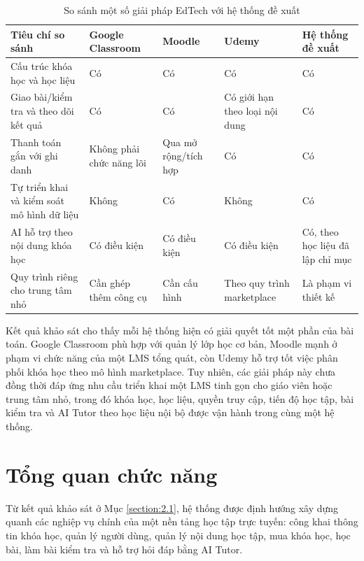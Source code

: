 ﻿\documentclass[../DoAn.tex]{subfiles}
\begin{document}
\begin{table}[H]
\centering
\caption{So sánh một số giải pháp EdTech với hệ thống đề xuất}
\label{table:2.1}
\small
\renewcommand{\arraystretch}{1.35}
\setlength{\tabcolsep}{4pt}
\begin{tabular}{|
>{\raggedright\arraybackslash}p{3.7cm}|
>{\centering\arraybackslash}p{2.35cm}|
>{\centering\arraybackslash}p{2.05cm}|
>{\centering\arraybackslash}p{2.05cm}|
>{\centering\arraybackslash}p{2.45cm}|}
\hline
\textbf{Tiêu chí so sánh} & \textbf{Google Classroom} & \textbf{Moodle} & \textbf{Udemy} & \textbf{Hệ thống đề xuất} \\ \hline
Cấu trúc khóa học và học liệu & Có & Có & Có & Có \\ \hline
Giao bài/kiểm tra và theo dõi kết quả & Có & Có & Có giới hạn theo loại nội dung & Có \\ \hline
Thanh toán gắn với ghi danh & Không phải chức năng lõi & Qua mở rộng/tích hợp & Có & Có \\ \hline
Tự triển khai và kiểm soát mô hình dữ liệu & Không & Có & Không & Có \\ \hline
AI hỗ trợ theo nội dung khóa học & Có điều kiện & Có điều kiện & Có điều kiện & Có, theo học liệu đã lập chỉ mục \\ \hline
Quy trình riêng cho trung tâm nhỏ & Cần ghép thêm công cụ & Cần cấu hình & Theo quy trình marketplace & Là phạm vi thiết kế \\ \hline
\end{tabular}
\end{table}

Kết quả khảo sát cho thấy mỗi hệ thống hiện có giải quyết tốt một phần của bài toán. Google Classroom phù hợp với quản lý lớp học cơ bản, Moodle mạnh ở phạm vi chức năng của một LMS tổng quát, còn Udemy hỗ trợ tốt việc phân phối khóa học theo mô hình marketplace. Tuy nhiên, các giải pháp này chưa đồng thời đáp ứng nhu cầu triển khai một LMS tinh gọn cho giáo viên hoặc trung tâm nhỏ, trong đó khóa học, học liệu, quyền truy cập, tiến độ học tập, bài kiểm tra và AI Tutor theo học liệu nội bộ được vận hành trong cùng một hệ thống.

\section{Tổng quan chức năng}
\label{section:2.2}

Từ kết quả khảo sát ở Mục \ref{section:2.1}, hệ thống được định hướng xây dựng quanh các nghiệp vụ chính của một nền tảng học tập trực tuyến: công khai thông tin khóa học, quản lý người dùng, quản lý nội dung học tập, mua khóa học, học bài, làm bài kiểm tra và hỗ trợ hỏi đáp bằng AI Tutor.
\end{document}
